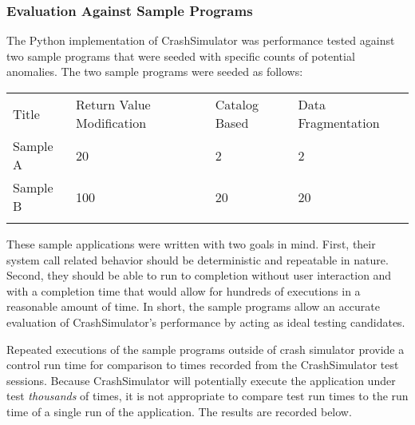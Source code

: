         \subsubsection{Evaluation Against Sample Programs}

            The Python implementation of CrashSimulator was performance
            tested against two sample programs that were seeded with specific counts of potential anomalies. The two sample
            programs were seeded as follows:

            \begin{table}[H]
                \scriptsize{}
                \begin{tabular}{l  l  l  l}
                    \toprule{}
                        Title & Return Value Modification & Catalog Based & Data Fragmentation \\
                        Sample A & 20 & 2 & 2 \\
                        Sample B & 100 & 20 & 20 \\
                    \bottomrule{}
                \end{tabular}
            \end{table}

            These sample applications were written with two goals in mind. First, their system call related behavior
            should be deterministic and repeatable in nature. Second, they should be able to run to completion without
            user interaction and with a completion time that would allow for hundreds of executions in a reasonable
            amount of time. In short, the sample programs allow an accurate evaluation of CrashSimulator's performance
            by acting as ideal testing candidates.

            Repeated executions of the sample programs outside of crash simulator provide a control run time for
            comparison to times recorded from the CrashSimulator test sessions. Because CrashSimulator will potentially
            execute the application under test \emph{thousands} of times, it is not appropriate to compare test run
            times to the run time of a single run of the application. The results are recorded below.

